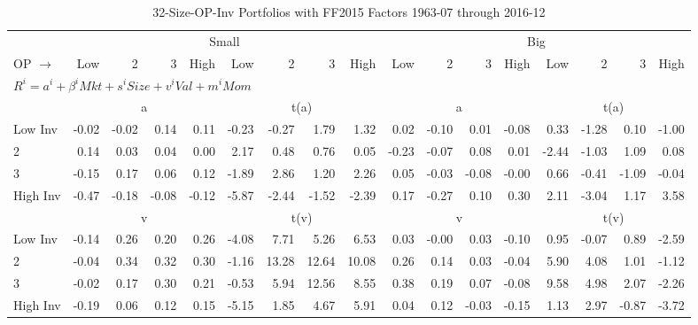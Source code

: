 
\begin{table}[!ht]
\centering
\caption{32-Size-OP-Inv Portfolios with FF2015 Factors 1963-07 through 2016-12}
\begin{tabular}{lrrrrrrrrrrrrrrrr}
  \toprule
    & \multicolumn{8}{c}{Small} & \multicolumn{8}{c}{Big} \\
      \cmidrule(r){2-9} \cmidrule(r){10-17}
    OP $\rightarrow$ & Low & 2 & 3 & High & Low & 2 & 3 & High & Low & 2 & 3 & High & Low & 2 & 3 & High \\ 
  \midrule
  \multicolumn{17}{l}{$R^i=a^i+\beta^iMkt+s^iSize+v^iVal+m^iMom$} \\

  
    
      & \multicolumn{4}{c}{a} & \multicolumn{4}{c}{t(a)}
    
      & \multicolumn{4}{c}{a} & \multicolumn{4}{c}{t(a)}
    
    \\
      \cmidrule(r){2-5} \cmidrule(r){6-9} \cmidrule(r){10-13} \cmidrule(r){14-17}

    Low Inv   & -0.02  & -0.02  & 0.14  & 0.11  & -0.23  & -0.27  & 1.79  & 1.32  & 0.02  & -0.10  & 0.01  & -0.08  & 0.33  & -1.28  & 0.10  & -1.00  \\
           2  & 0.14  & 0.03  & 0.04  & 0.00  & 2.17  & 0.48  & 0.76  & 0.05  & -0.23  & -0.07  & 0.08  & 0.01  & -2.44  & -1.03  & 1.09  & 0.08  \\
           3  & -0.15  & 0.17  & 0.06  & 0.12  & -1.89  & 2.86  & 1.20  & 2.26  & 0.05  & -0.03  & -0.08  & -0.00  & 0.66  & -0.41  & -1.09  & -0.04  \\
    High Inv  & -0.47  & -0.18  & -0.08  & -0.12  & -5.87  & -2.44  & -1.52  & -2.39  & 0.17  & -0.27  & 0.10  & 0.30  & 2.11  & -3.04  & 1.17  & 3.58  \\

  
    
      & \multicolumn{4}{c}{v} & \multicolumn{4}{c}{t(v)}
    
      & \multicolumn{4}{c}{v} & \multicolumn{4}{c}{t(v)}
    
    \\
      \cmidrule(r){2-5} \cmidrule(r){6-9} \cmidrule(r){10-13} \cmidrule(r){14-17}

    Low Inv   & -0.14  & 0.26  & 0.20  & 0.26  & -4.08  & 7.71  & 5.26  & 6.53  & 0.03  & -0.00  & 0.03  & -0.10  & 0.95  & -0.07  & 0.89  & -2.59  \\
           2  & -0.04  & 0.34  & 0.32  & 0.30  & -1.16  & 13.28  & 12.64  & 10.08  & 0.26  & 0.14  & 0.03  & -0.04  & 5.90  & 4.08  & 1.01  & -1.12  \\
           3  & -0.02  & 0.17  & 0.30  & 0.21  & -0.53  & 5.94  & 12.56  & 8.55  & 0.38  & 0.19  & 0.07  & -0.08  & 9.58  & 4.98  & 2.07  & -2.26  \\
    High Inv  & -0.19  & 0.06  & 0.12  & 0.15  & -5.15  & 1.85  & 4.67  & 5.91  & 0.04  & 0.12  & -0.03  & -0.15  & 1.13  & 2.97  & -0.87  & -3.72  \\


\end{tabular}
\end{table}
